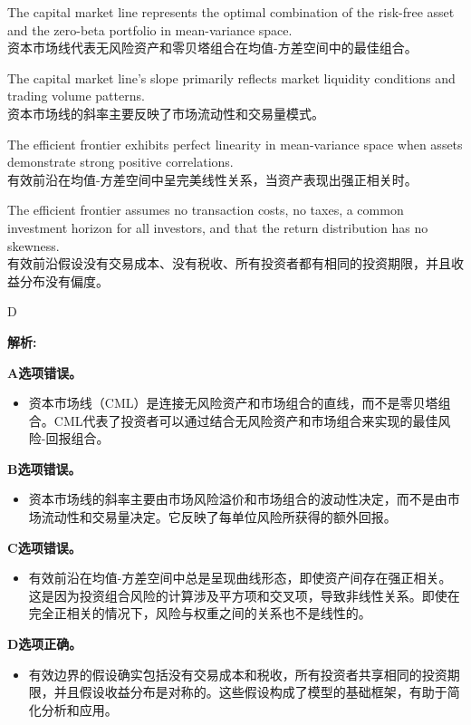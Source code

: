 \documentclass{article}
\newenvironment{explanation}
{\textbf{解析:}\par}
{\par}
\begin{document}
\begin{choices}
        \item The capital market line represents the optimal combination of the risk-free asset and the zero-beta portfolio in mean-variance space.\\
    资本市场线代表无风险资产和零贝塔组合在均值-方差空间中的最佳组合。
    
    \item The capital market line's slope primarily reflects market liquidity conditions and trading volume patterns.\\
    资本市场线的斜率主要反映了市场流动性和交易量模式。
    
    \item The efficient frontier exhibits perfect linearity in mean-variance space when assets demonstrate strong positive correlations.\\
    有效前沿在均值-方差空间中呈完美线性关系，当资产表现出强正相关时。
    
    \item The efficient frontier assumes no transaction costs, no taxes, a common investment horizon for all investors, and that the return distribution has no skewness.\\
    有效前沿假设没有交易成本、没有税收、所有投资者都有相同的投资期限，并且收益分布没有偏度。
\end{choices}

\begin{correctanswer}
    D
\end{correctanswer}

\begin{explanation}
    \textbf{A选项错误。}
    \begin{itemize}
        \item 资本市场线（CML）是连接无风险资产和市场组合的直线，而不是零贝塔组合。CML代表了投资者可以通过结合无风险资产和市场组合来实现的最佳风险-回报组合。
    \end{itemize}

    \textbf{B选项错误。}
    \begin{itemize}
        \item 资本市场线的斜率主要由市场风险溢价和市场组合的波动性决定，而不是由市场流动性和交易量决定。它反映了每单位风险所获得的额外回报。
    \end{itemize}

    \textbf{C选项错误。}
    \begin{itemize}
        \item 有效前沿在均值-方差空间中总是呈现曲线形态，即使资产间存在强正相关。这是因为投资组合风险的计算涉及平方项和交叉项，导致非线性关系。即使在完全正相关的情况下，风险与权重之间的关系也不是线性的。
    \end{itemize}

    \textbf{D选项正确。}
    \begin{itemize}
        \item 有效边界的假设确实包括没有交易成本和税收，所有投资者共享相同的投资期限，并且假设收益分布是对称的。这些假设构成了模型的基础框架，有助于简化分析和应用。
    \end{itemize}
\end{explanation}
\end{document}
